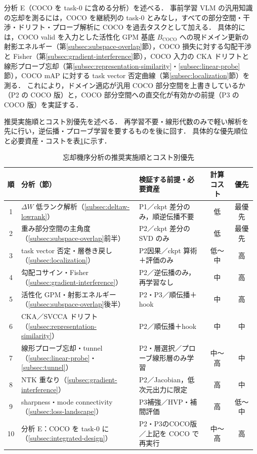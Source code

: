 分析 E（COCO を task-0 に含める分析）を述べる．
事前学習 VLM の汎用知識の忘却を測るには，COCO を継続列の task-0 とみなし，すべての部分空間・干渉・ドリフト・プローブ解析に COCO を過去タスクとして加える．
具体的には，COCO valid を入力とした活性化 GPM 基底 $B_{\mathrm{COCO}}$ への現ドメイン更新の射影エネルギー（第\ref{subsec:subspace-overlap}節），COCO 損失に対する勾配干渉と Fisher（第\ref{subsec:gradient-interference}節），COCO 入力の CKA ドリフトと線形プローブ忘却（第\ref{subsec:representation-similarity}・\ref{subsec:linear-probe}節），COCO mAP に対する task vector 否定曲線（第\ref{subsec:localization}節）を測る．
これにより，ドメイン適応が汎用 COCO 部分空間を上書きしているか（P2 の COCO 版）と，COCO 部分空間への直交化が有効かの前提（P3 の COCO 版）を実証する．

推奨実施順とコスト別優先を述べる．
再学習不要・線形代数のみで軽い解析を先に行い，逆伝播・プローブ学習を要するものを後に回す．
具体的な優先順位と必要資産・コストを表\ref{tab:analysis-priority}に示す．

\begin{table}[t]
\centering
\caption{忘却機序分析の推奨実施順とコスト別優先}
\label{tab:analysis-priority}
\begin{tabularx}{\linewidth}{c l X c c}
\hline
順 & 分析（節） & 検証する前提・必要資産 & 計算コスト & 優先 \\
\hline
1 & $\Delta W$ 低ランク解析（\ref{subsec:deltaw-lowrank}） & P1／ckpt 差分のみ，順逆伝播不要 & 低 & 最優先 \\
2 & 重み部分空間の主角度（\ref{subsec:subspace-overlap}前半） & P2／ckpt 差分の SVD のみ & 低 & 最優先 \\
3 & task vector 否定・層巻き戻し（\ref{subsec:localization}） & P2因果／ckpt 算術＋評価のみ & 低〜中 & 高 \\
4 & 勾配コサイン・Fisher（\ref{subsec:gradient-interference}） & P2／逆伝播のみ，再学習なし & 中 & 高 \\
5 & 活性化 GPM・射影エネルギー（\ref{subsec:subspace-overlap}後半） & P2・P3／順伝播＋hook & 中 & 高 \\
6 & CKA／SVCCA ドリフト（\ref{subsec:representation-similarity}） & P2／順伝播＋hook & 中 & 中 \\
7 & 線形プローブ忘却・tunnel（\ref{subsec:linear-probe}・\ref{subsec:tunnel}） & P2・層選択／プローブ線形層のみ学習 & 中〜高 & 中 \\
8 & NTK 重なり（\ref{subsec:gradient-interference}） & P2／Jacobian，低次元出力に限定 & 高 & 中 \\
9 & sharpness・mode connectivity（\ref{subsec:loss-landscape}） & P3補強／HVP・補間評価 & 高 & 低〜中 \\
10 & 分析 E：COCO を task-0 に（\ref{subsec:integrated-design}） & P2・P3のCOCO版／上記を COCO で再実行 & 中〜高 & 高 \\
\hline
\end{tabularx}
\end{table}

